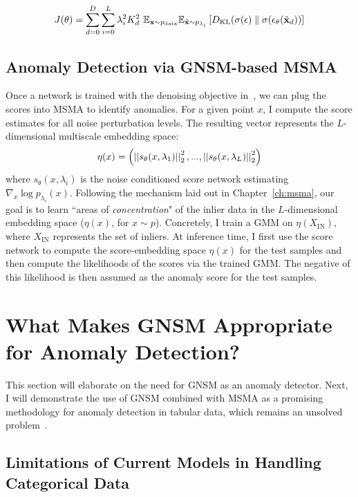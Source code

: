 \begin{equation}
\label{kl_obj}
    J(\theta)  =  \sum_{d=0}^{D} \sum_{i=0}^{L} \lambda_i^2 K_d^2 ~\mathbb{E}_{\mathbf{x} \sim p_{\text{data}}} \mathbb{E}_{\Tilde{\mathbf{x}} \sim p_{\lambda_i}} \left[ { D_{\text{KL}} (\sigma(\epsilon) \parallel  \sigma( \epsilon_\theta(\tilde{\mathbf{x}}_d) ) } \right]
\end{equation}


\subsection*{Anomaly Detection via GNSM-based MSMA}
Once a network is trained with the denoising objective in~, we can plug the scores into MSMA to identify anomalies. For a given point $x$, I compute the score estimates for all noise perturbation levels. The resulting vector represents the $L$-dimensional multiscale embedding space:
\begin{equation}\label{eq:norms}
    \eta(x) = \left( \left|\left| {  s_\theta(x, \lambda_1) } \right|\right|_2^2, ... , \left|\left| {  s_\theta(x, \lambda_L) } \right|\right|_2^2 \right)
\end{equation}
where $s_\theta(x, \lambda_i)$ is the noise conditioned score network estimating $\nabla_{x} \log p_{\lambda_i}(x)$.
Following the mechanism laid out in Chapter~\ref{ch:msma}, our goal is to learn ``areas of \emph{concentration}" of the inlier data in the $L$-dimensional embedding space ($\eta(x)$, for $x\sim p$). Concretely, I train a GMM on $\eta(X_{\text{IN}})$, where $X_{\text{IN}}$ represents the set of inliers. At inference time, I first use the score network to compute the score-embedding space $\eta(x)$ for the test samples and then compute the likelihoods of the scores via the trained GMM. The negative of this likelihood is then assumed as the anomaly score for the test samples.

\section{What Makes GNSM Appropriate for Anomaly Detection?}\label{sec:gumbel_ano}

This section will elaborate on the need for GNSM as an anomaly detector. Next, I will demonstrate the use of GNSM combined with MSMA as a promising methodology for anomaly detection in tabular data, which remains an unsolved problem~\cite{pang_deep_2021, ruff_unifying_2021, aggarwal_introduction_2017}.  

\subsection*{Limitations of Current Models in Handling Categorical Data}

